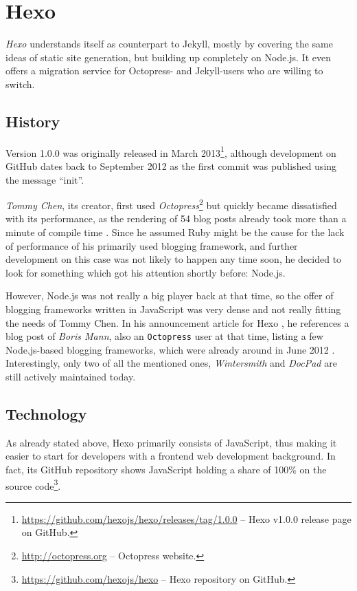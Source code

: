 \section{Hexo}
\label{sec:hexo}

\emph{Hexo} understands itself as counterpart to Jekyll, mostly by covering the same ideas of static site generation, but building up completely on Node.js. It even offers a migration service for Octopress- and Jekyll-users who are willing to switch.

\subsection{History}
\label{sec:hexo-history}
Version 1.0.0 was originally released in March 2013\footnote{\url{https://github.com/hexojs/hexo/releases/tag/1.0.0} -- Hexo v1.0.0 release page on GitHub.}, although development on GitHub dates back to September 2012 as the first commit was published using the message  ``init''.

\emph{Tommy Chen}, its creator, first used \emph{Octopress}\footnote{\url{http://octopress.org} -- Octopress website.} but quickly became dissatisfied with its performance, as the rendering of 54 blog posts already took more than a minute of compile time \cite{Chen2012hexodebut}. Since he assumed Ruby might be the cause for the lack of performance of his primarily used blogging framework, and further development on this case was not likely to happen any time soon, he decided to look for something which got his attention shortly before: Node.js.

However, Node.js was not really a big player back at that time, so the offer of blogging frameworks written in JavaScript was very dense and not really fitting the needs of Tommy Chen. In his announcement article for Hexo \cite{Chen2012hexodebut}, he references a blog post of \emph{Boris Mann}, also an \texttt{Octopress} user at that time, listing a few Node.js-based blogging frameworks, which were already around in June 2012 \cite{Mann2012nodestaticsite}. Interestingly, only two of all the mentioned ones, \emph{Wintersmith} and \emph{DocPad} are still actively maintained today.

\subsection{Technology}
\label{sec:hexo-technology}
As already stated above, Hexo primarily consists of JavaScript, thus making it easier to start for developers with a frontend web development background. In fact, its GitHub repository shows JavaScript holding a share of 100\% on the source code\footnote{\url{https://github.com/hexojs/hexo} -- Hexo repository on GitHub.}.

